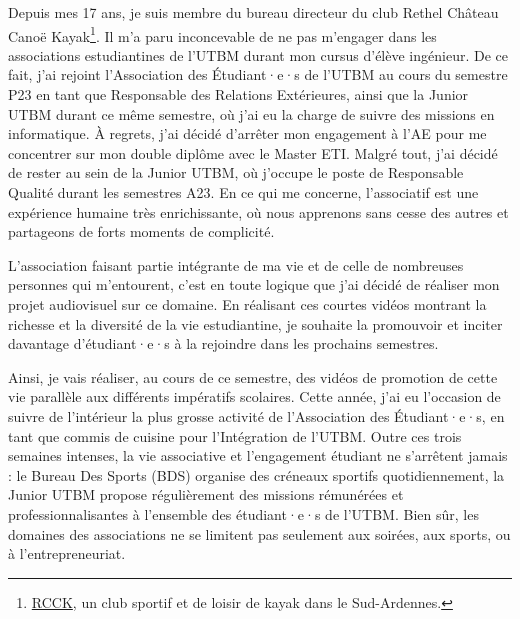 
Depuis mes 17 ans, je suis membre du bureau directeur du club Rethel Château Canoë Kayak\footnote{\href{https://rcck-ardennes.fr}{RCCK}, un club sportif et de loisir de kayak dans le Sud-Ardennes.}.
Il m'a paru inconcevable de ne pas m'engager dans les associations estudiantines de l'\gls{UTBM} durant mon cursus d'élève ingénieur.
De ce fait, j'ai rejoint l'Association des Étudiant·e·s de l'\gls{UTBM} au cours du semestre P23 en tant que Responsable des Relations Extérieures, ainsi que la Junior \gls{UTBM} durant ce même semestre, où j'ai eu la charge de suivre des missions en informatique.
À regrets, j'ai décidé d'arrêter mon engagement à l'\gls{AE} pour me concentrer sur mon double diplôme avec le Master ETI. Malgré tout, j'ai décidé de rester au sein de la Junior \gls{UTBM}, où j'occupe le poste de Responsable Qualité durant les semestres A23.
En ce qui me concerne, l'associatif est une expérience humaine très enrichissante, où nous apprenons sans cesse des autres et partageons de forts moments de complicité.

L'association faisant partie intégrante de ma vie et de celle de nombreuses personnes qui m'entourent, c'est en toute logique que j'ai décidé de réaliser mon projet audiovisuel sur ce domaine.
En réalisant ces courtes vidéos montrant la richesse et la diversité de la vie estudiantine, je souhaite la promouvoir et inciter davantage d'étudiant·e·s à la rejoindre dans les prochains semestres.

Ainsi, je vais réaliser, au cours de ce semestre, des vidéos de promotion de cette vie parallèle aux différents impératifs scolaires.
Cette année, j'ai eu l'occasion de suivre de l'intérieur la plus grosse activité de l'Association des Étudiant·e·s, en tant que commis de cuisine pour l'Intégration de l'\gls{UTBM}.
Outre ces trois semaines intenses, la vie associative et l'engagement étudiant ne s'arrêtent jamais : le Bureau Des Sports (BDS) organise des créneaux sportifs quotidiennement, la Junior \gls{UTBM} propose régulièrement des missions rémunérées et professionnalisantes à l'ensemble des étudiant·e·s de l'\gls{UTBM}.
Bien sûr, les domaines des associations ne se limitent pas seulement aux soirées, aux sports, ou à l'entrepreneuriat.